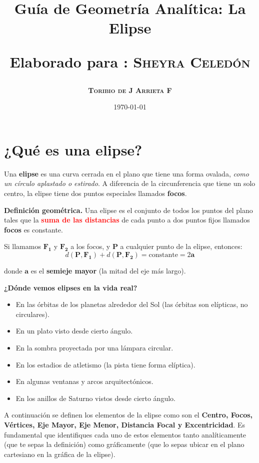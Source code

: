 \documentclass[12pt,a4paper]{article}
\title{\Large Guía de Geometría Analítica: La Elipse

\small{Elaborado para : \textsc{\bf{Sheyra Celedón}}}}
\author{\bf{\textsc{Toribio de J Arrieta F}}}
\date{\today}
\begin{document}
	\maketitle

	\section{¿Qué es una elipse?}

	Una \textbf{elipse} es una curva cerrada en el plano que tiene una forma ovalada, \emph{como un círculo aplastado o estirado}. A diferencia de la circunferencia que tiene un solo centro, la elipse tiene dos puntos especiales llamados \textbf{focos}.

	\bigskip

	\textbf{Definición geométrica.} Una elipse es el conjunto de todos los puntos del plano tales que la \textcolor{red}{\textbf{suma de las distancias}} de cada punto a dos puntos fijos llamados \textbf{focos} es constante.

	\bigskip

	Si llamamos $\bm{F_1}$ y $\bm{F_2}$ a los focos, y $\bm{P}$ a cualquier punto de la elipse, entonces:
	\[
	d(\bm{P},\bm{F_1})+d(\bm{P},\bm{F_2})=\text{constante}=2\bm{a}
	\]

	donde $\bm{a}$ es el \textbf{semieje mayor} (la mitad del eje más largo).

	\bigskip

	\textbf{¿Dónde vemos elipses en la vida real?}
	\begin{itemize}
		\item En las órbitas de los planetas alrededor del Sol (las órbitas son elípticas, no circulares).
		\item En un plato visto desde cierto ángulo.
		\item En la sombra proyectada por una lámpara circular.
		\item En los estadios de atletismo (la pista tiene forma elíptica).
		\item En algunas ventanas y arcos arquitectónicos.
		\item En los anillos de Saturno vistos desde cierto ángulo.
	\end{itemize}

	\bigskip

	A continuación se definen los elementos de la elipse como son el \textbf{Centro, Focos, Vértices, Eje Mayor, Eje Menor, Distancia Focal y Excentricidad}. Es fundamental que identifiques cada uno de estos elementos tanto analíticamente (que te sepas la definición) como gráficamente (que lo sepas ubicar en el plano cartesiano en la gráfica de la elipse).
\end{document}
